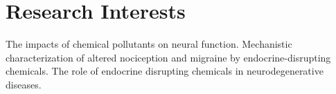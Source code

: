 \section{\mysidestyle Research Interests} The impacts of chemical pollutants on neural function. Mechanistic characterization of altered nociception and migraine by endocrine-disrupting chemicals. The role of endocrine disrupting chemicals in neurodegenerative diseases.